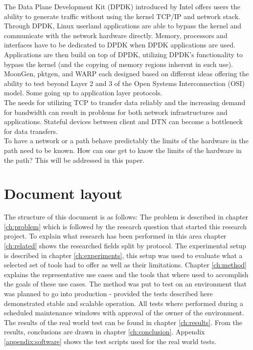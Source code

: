 The Data Plane Development Kit\cite{dpdk} (DPDK) introduced by Intel offers users the ability to generate traffic without using the kernel TCP/IP and network stack.  
Through DPDK, Linux userland applications are able to bypass the kernel and communicate with the network hardware directly. Memory, processors and interfaces have to be dedicated to DPDK  when DPDK applications are used.
Applications are then build on top of DPDK, utilizing DPDK's functionality to bypass the kernel (and the copying of memory regions inherent in such use). MoonGen\cite{moongen}, pktgen\cite{pktgen-dpdk}, and WARP\cite{warp} each designed based on different ideas offering the ability to test beyond Layer 2 and 3 of the Open Systems Interconnection (OSI) model.
Some going up to application layer protocols.\\ 

The needs for utilizing TCP to transfer data reliably and the increasing demand for bandwidth can result in problems for both network infrastructures and applications. 
Stateful devices between client and DTN can become a bottleneck for data transfers.\\ 
To have a network or a path behave predictably the limits of the hardware in the path need to be known.
How can one get to know the limits of the hardware in the path?
This will be addressed in this paper.  

\section{Document layout}\label{sec:layout}

The structure of this document is as follows: The problem is described in chapter \ref{ch:problem} which is followed by the research question that started this research project. To explain what research has been performed in this area chapter \ref{ch:related} shows the researched fields split by protocol. The experimental setup is described in chapter \ref{ch:experiments}, this setup was used to evaluate what a selected set of tools had to offer as well as their limitations.
Chapter \ref{ch:method} explains the representative use cases and the tools that where used to accomplish the goals of these use cases. The method was put to test on an environment that was planned to go into production - provided the tests described here demonstrated stable and scalable operation. All tests where performed during a scheduled maintenance windows with approval of the owner of the environment. The results of the real world test can be found in chapter \ref{ch:results}. 
From the results, conclusions are drawn in chapter \ref{ch:conclusion}. Appendix \ref{appendix:software} shows the test scripts used for the real world tests. 


